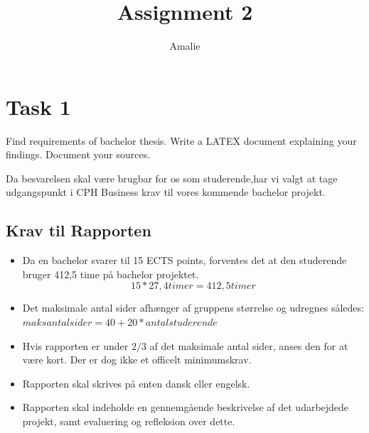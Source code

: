 \documentclass{article}
\author{Amalie}
\title{Assignment 2}
\begin{document}
    
\clearpage\maketitle
\thispagestyle{empty}
\newpage
\tableofcontents
\listoffigures
\listoftables

\section{Task 1}

    Find requirements of bachelor thesis. Write a LATEX document explaining your
    findings. Document your sources.
    \newline 

    Da besvarelsen skal være brugbar for os som studerende,har vi valgt at tage udgangspunkt i CPH Business krav til vores kommende bachelor projekt. \cite{softwebsite}

    \subsection*{Krav til Rapporten}
    \begin{itemize}
        \item Da en bachelor svarer til 15 ECTS points, forventes det at den studerende bruger 412,5 time på bachelor projektet.  
            \[ 15 * 27,4 timer = 412,5 timer \]
        \item Det maksimale antal sider afhænger af gruppens størrelse og udregnes således: \(maksantalsider = 40 + 20 * antalstuderende\)
        \item Hvis rapporten er under \(2/3\) af det maksimale antal sider, anses den for at være kort. Der er dog ikke et officelt minimumskrav.  
        \item Rapporten skal skrives på enten dansk eller engelsk.
        \item Rapporten skal indeholde en gennemgående beskrivelse af det udarbejdede projekt, samt evaluering og refleksion over dette.
    \end{itemize}
\end{document}
